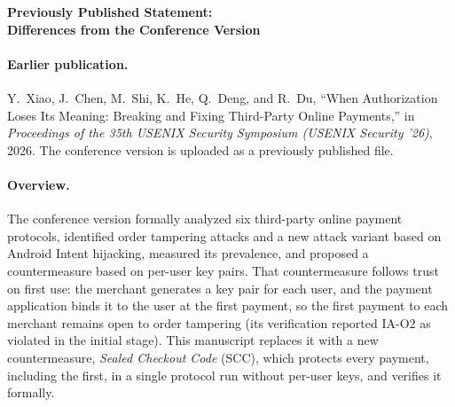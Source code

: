 \documentclass[11pt]{article}
\begin{document}
\begin{center}
{\Large\bfseries Previously Published Statement:\\[2pt] Differences from the Conference Version}
\end{center}

\paragraph{Earlier publication.}
Y.~Xiao, J.~Chen, M.~Shi, K.~He, Q.~Deng, and R.~Du,
``When Authorization Loses Its Meaning: Breaking and Fixing Third-Party Online Payments,''
in \emph{Proceedings of the 35th USENIX Security Symposium (USENIX Security '26)}, 2026.
The conference version is uploaded as a previously published file.

\paragraph{Overview.}
The conference version formally analyzed six third-party online payment protocols, identified order tampering attacks and a new attack variant based on Android Intent hijacking, measured its prevalence, and proposed a countermeasure based on per-user key pairs.
That countermeasure follows trust on first use: the merchant generates a key pair for each user, and the payment application binds it to the user at the first payment, so the first payment to each merchant remains open to order tampering (its verification reported IA-O2 as violated in the initial stage).
This manuscript replaces it with a new countermeasure, \emph{Sealed Checkout Code} (SCC), which protects every payment, including the first, in a single protocol run without per-user keys, and verifies it formally.
\end{document}
